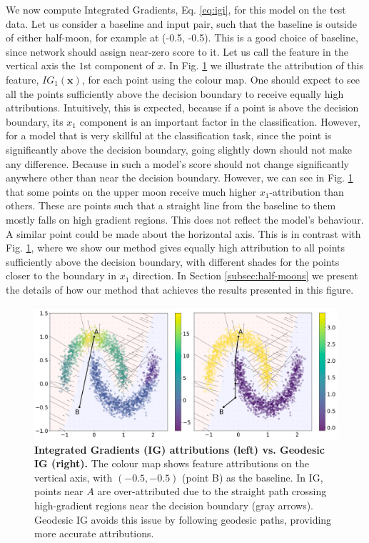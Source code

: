 We now compute Integrated Gradients, Eq. \ref{eq:igi}, for this model on the test data. Let us consider a baseline and input pair, such that the baseline is outside of either half-moon, for example at (-0.5, -0.5). This is a good choice of baseline, since network should assign near-zero score to it. Let us call the feature in the vertical axis the $1$st component of $x$. In Fig. \ref{fig:ig} we illustrate the attribution of this feature, $IG_1(\textbf{x})$, for each point using the colour map. One should expect to see all the points sufficiently above the decision boundary to receive equally high attributions. Intuitively, this is expected, because if a point is above the decision boundary, its $x_1$ component is an important factor in the classification. However, for a model that is very skillful at the classification task, since the point is significantly above the decision boundary, going slightly down should not make any difference. Because in such a model's score should not change significantly anywhere other than near the decision boundary. However, we can see in Fig. \ref{fig:ig} that some points on the upper moon receive much higher $x_1$-attribution than others. These are points such that a straight line from the baseline to them mostly falls on high gradient regions. This does not reflect the model's behaviour. A similar point could be made about the horizontal axis. This is in contrast with Fig. \ref{fig:ig}, where we show our method gives equally high attribution to all points sufficiently above the decision boundary, with different shades for the points closer to the boundary in $x_1$ direction. In Section \ref{subsec:half-moons} we present the details of how our method that achieves the results presented in this figure.

\begin{figure}[t!]
\vskip -0.1in
\begin{center}
\centerline{\includegraphics[width=\columnwidth]{figures/half_moons_y.png}}
\vskip -0.2in

\caption{\textbf{Integrated Gradients (IG) attributions (left) vs. Geodesic IG (right).} The colour map shows feature attributions on the vertical axis, with $(-0.5, -0.5)$ (point B) as the baseline. In IG, points near $A$ are over-attributed due to the straight path crossing high-gradient regions near the decision boundary (gray arrows). Geodesic IG avoids this issue by following geodesic paths, providing more accurate attributions.}
\label{fig:ig}
\end{center}
\vskip -0.2in
\end{figure}

